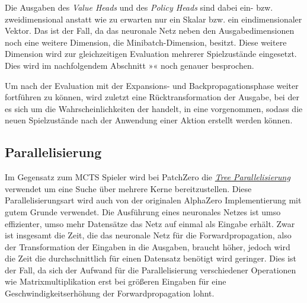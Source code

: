 \vspace*{-0.1cm}

\vspace*{-0.2cm}

Die Ausgaben des \emph{Value Heads} und des \emph{Policy Heads} sind dabei ein- bzw. zweidimensional anstatt wie zu erwarten nur ein Skalar bzw. ein eindimensionaler Vektor. Das ist der Fall, da das neuronale Netz neben den Ausgabedimensionen noch eine weitere Dimension, die Minibatch-Dimension, besitzt. Diese weitere Dimension wird zur gleichzeitigen Evaluation mehrerer Spielzustände eingesetzt. Dies wird im nachfolgendem Abschnitt »« noch genauer besprochen.

\vspace*{-5cm}
\pagebreak

Um nach der Evaluation mit der Expansions- und Backpropagationsphase weiter fortführen zu können, wird zuletzt eine Rücktransformation der Ausgabe, bei der es sich um die Wahrscheinlichkeiten der \hyperref[text:natural-action-id]{} handelt, in eine \hyperref[text:action-id]{} vorgenommen, sodass die neuen Spielzustände nach der Anwendung einer Aktion erstellt werden können.

\subsection{Parallelisierung}
\label{section:erstellung-ansatz-d-parallelisierung}

Im Gegensatz zum \ac{MCTS} Spieler wird bei PatchZero die \hyperref[text:tree-parallelization]{\emph{Tree Parallelisierung}} verwendet um eine Suche über mehrere Kerne bereitzustellen. Diese Parallelisierungsart wird auch von der originalen AlphaZero Implementierung mit gutem Grunde verwendet. Die Ausführung eines neuronales Netzes ist umso effizienter, umso mehr Datensätze das Netz auf einmal als Eingabe erhält. Zwar ist insgesamt die Zeit, die das neuronale Netz für die Forwardpropagation, also der Transformation der Eingaben in die Ausgaben, braucht höher, jedoch wird die Zeit die durchschnittlich für einen Datensatz benötigt wird geringer. Dies ist der Fall, da sich der Aufwand für die Parallelisierung verschiedener Operationen wie Matrixmultiplikation erst bei größeren Eingaben für eine Geschwindigkeitserhöhung der Forwardpropagation lohnt. \cite[S. 201f.]{2021.NetworkParallelization}

